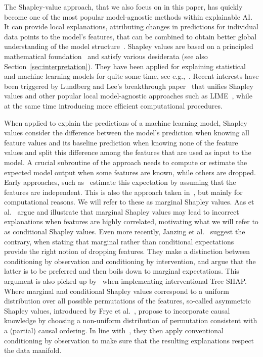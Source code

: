 \documentclass{article}
\begin{document}
The Shapley-value approach, that we also focus on in this paper, has quickly become one of the most popular model-agnostic methods within explainable AI. It can provide local explanations, attributing changes in predictions for individual data points to the model's features, that can be combined to obtain better global understanding of the model structure~\cite{lundberg2020local}. Shapley values are based on a principled mathematical foundation~\cite{shapley1953value} and satisfy various desiderata (see also Section~\ref{sec:interpretation}). They have been applied for explaining statistical and machine learning models for quite some time, see e.g.,~\cite{lipovetsky2001analysis,vstrumbelj2014explaining}. Recent interests have been triggered by Lundberg and Lee's breakthrough paper~\cite{lundberg2017unified} that unifies Shapley values and other popular local model-agnostic approaches such as LIME~\cite{ribeiro2016should}, while at the same time introducing more efficient computational procedures.

When applied to explain the predictions of a machine learning model, Shapley values consider the difference between the model's prediction when knowing all feature values and its baseline prediction when knowing none of the feature values and split this difference among the features that are used as input to the model. A crucial subroutine of the approach needs to compute or estimate the expected model output when some features are known, while others are dropped. Early approaches, such as~\cite{vstrumbelj2014explaining} estimate this expectation by assuming that the features are independent. This is also the approach taken in~\cite{lundberg2017unified}, but mainly for computational reasons. We will refer to these as marginal Shapley values. Aas et al.~\cite{aas2019explaining} argue and illustrate that marginal Shapley values may lead to incorrect explanations when features are highly correlated, motivating what we will refer to as conditional Shapley values. Even more recently, Janzing et al.~\cite{janzing2019feature} suggest the contrary, when stating that marginal rather than conditional expectations provide the right notion of dropping features. They make a distinction between conditioning by observation and conditioning by intervention, and argue that the latter is to be preferred and then boils down to marginal expectations. This argument is also picked up by~\cite{lundberg2020local} when implementing interventional Tree SHAP. Where marginal and conditional Shapley values correspond to a uniform distribution over all possible permutations of the features, so-called asymmetric Shapley values, introduced by Frye et al.~\cite{frye2019asymmetric}, propose to incorporate causal knowledge by choosing a non-uniform distribution of permutation consistent with a (partial) causal ordering. In line with~\cite{aas2019explaining}, they then apply conventional conditioning by observation to make sure that the resulting explanations respect the data manifold.
\end{document}
